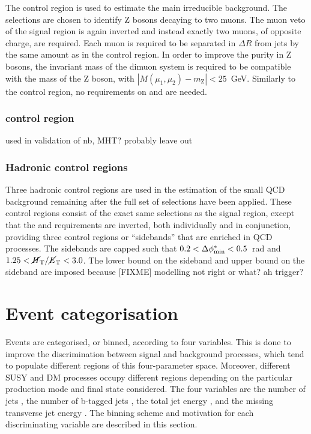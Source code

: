 The \mmj control region is used to estimate the main irreducible \znnj 
background. The selections are chosen to identify Z bosons decaying to two 
muons. The muon veto of the signal region is again inverted and instead exactly 
two muons, of opposite charge, are required. Each muon is required to be 
separated in $\Delta R$ from jets by the same amount as in the \mj control 
region. In order to improve the purity in Z bosons, the invariant mass of the 
dimuon system is required to be compatible with the mass of the Z boson, with 
$|M(\mu_1,\mu_2) - m_\mathrm{Z}| < 25$~GeV. Similarly to the \mj control 
region, no requirements on \alphat and \bdphi are needed.


\subsubsection{\gj control region}
used in validation of nb, MHT?
probably leave out

\subsubsection{Hadronic control regions}

Three hadronic control regions are used in the estimation of the small QCD 
background remaining after the full set of selections have been applied. These 
control regions consist of the exact same selections as the signal region, 
except that the \bdphi and \mhtmet requirements are inverted, both individually 
and in conjunction, providing three control regions or ``sidebands'' that are 
enriched in QCD processes. The sidebands are capped such that 
$0.2<\mbox{$\Delta\phi^{*}_{\mathrm{min}}$}<0.5$~rad and $1.25<\mbox{$\mbox{$\cancel{H}_\text{T}$} / \mbox{$\cancel{E}_\text{T}$}$}<3.0$. The lower bound on the \bdphi 
sideband and upper bound on the \mhtmet sideband are imposed because [FIXME] 
modelling not right or what? ah trigger?

\section{Event categorisation}

Events are categorised, or binned, according to four variables. This is done to 
improve the discrimination between signal and background processes, which tend 
to populate different regions of this four-parameter space. Moreover, different 
SUSY and DM processes occupy different regions depending on the particular 
production mode and final state considered. The four variables are the number 
of jets \njet, the number of b-tagged jets \nb, the total jet energy \scalht, 
and the missing transverse jet energy \mht. The binning scheme and motivation 
for each discriminating variable are described in this section.

